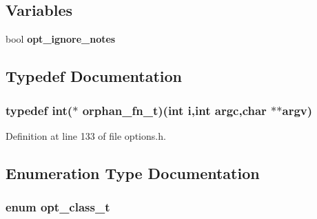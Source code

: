 \subsection*{Variables}
\begin{CompactItemize}
\item 
bool {\bf opt\_\-ignore\_\-notes}
\end{CompactItemize}


\subsection{Typedef Documentation}
\subsubsection[{orphan\_\-fn\_\-t}]{\setlength{\rightskip}{0pt plus 5cm}typedef int($\ast$ {\bf orphan\_\-fn\_\-t})(int i,int argc,char $\ast$$\ast$argv)}\label{options_8h_14d29551e8d9d50370f93d6f1729fee4}




Definition at line 133 of file options.h.

\subsection{Enumeration Type Documentation}
\subsubsection[{opt\_\-class\_\-t}]{\setlength{\rightskip}{0pt plus 5cm}enum {\bf opt\_\-class\_\-t}}\label{options_8h_df032dd28ab2078e196d20be488993ab}


